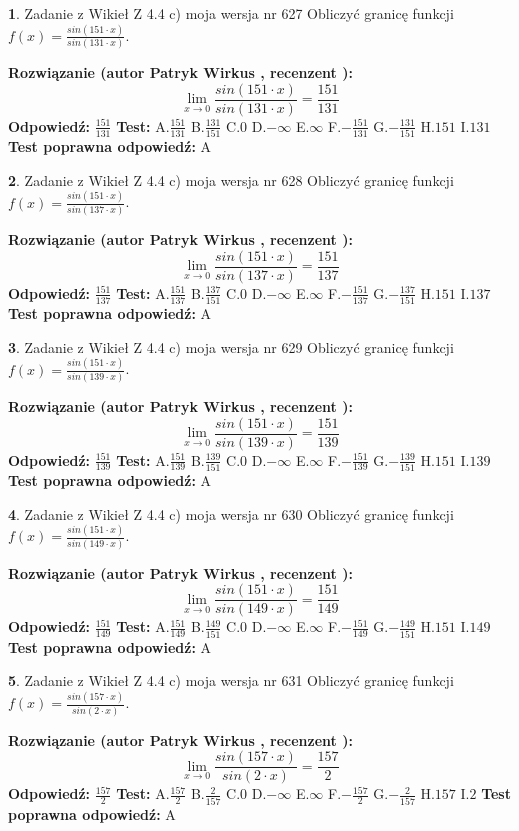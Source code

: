 \documentclass[12pt, a4paper]{article}
\theoremstyle{definition} %
\newtheorem{zad}{}
\newcommand{\zadStart}[1]{\begin{zad}#1\newline}
\newcommand{\zadStop}{\end{zad}}
\newcommand{\rozwStart}[2]{\noindent \textbf{Rozwiązanie (autor #1 , recenzent #2): }\newline}
\newcommand{\rozwStop}{\newline}
\newcommand{\odpStart}{\noindent \textbf{Odpowiedź:}\newline}
\newcommand{\odpStop}{\newline}
\newcommand{\testStart}{\noindent \textbf{Test:}\newline}
\newcommand{\testStop}{\newline}
\newcommand{\kluczStart}{\noindent \textbf{Test poprawna odpowiedź:}\newline}
\newcommand{\kluczStop}{\newline}
\begin{document}
\zadStart{Zadanie z Wikieł Z 4.4 c) moja wersja nr 627}
Obliczyć granicę funkcji $f(x)=\frac{sin(151\cdot x)}{sin(131\cdot x)}$.
\zadStop
\rozwStart{Patryk Wirkus}{}
$$\lim\limits_{x\to 0}\frac{sin(151\cdot x)}{sin(131\cdot x)}=
\frac{151}{131}$$
\rozwStop
\odpStart
$\frac{151}{131}$
\odpStop
\testStart
A.$\frac{151}{131}$
B.$\frac{131}{151}$
C.$0$
D.$-\infty$
E.$\infty$
F.$-\frac{151}{131}$
G.$-\frac{131}{151}$
H.$151$
I.$131$
\testStop
\kluczStart
A
\kluczStop



\zadStart{Zadanie z Wikieł Z 4.4 c) moja wersja nr 628}
Obliczyć granicę funkcji $f(x)=\frac{sin(151\cdot x)}{sin(137\cdot x)}$.
\zadStop
\rozwStart{Patryk Wirkus}{}
$$\lim\limits_{x\to 0}\frac{sin(151\cdot x)}{sin(137\cdot x)}=
\frac{151}{137}$$
\rozwStop
\odpStart
$\frac{151}{137}$
\odpStop
\testStart
A.$\frac{151}{137}$
B.$\frac{137}{151}$
C.$0$
D.$-\infty$
E.$\infty$
F.$-\frac{151}{137}$
G.$-\frac{137}{151}$
H.$151$
I.$137$
\testStop
\kluczStart
A
\kluczStop



\zadStart{Zadanie z Wikieł Z 4.4 c) moja wersja nr 629}
Obliczyć granicę funkcji $f(x)=\frac{sin(151\cdot x)}{sin(139\cdot x)}$.
\zadStop
\rozwStart{Patryk Wirkus}{}
$$\lim\limits_{x\to 0}\frac{sin(151\cdot x)}{sin(139\cdot x)}=
\frac{151}{139}$$
\rozwStop
\odpStart
$\frac{151}{139}$
\odpStop
\testStart
A.$\frac{151}{139}$
B.$\frac{139}{151}$
C.$0$
D.$-\infty$
E.$\infty$
F.$-\frac{151}{139}$
G.$-\frac{139}{151}$
H.$151$
I.$139$
\testStop
\kluczStart
A
\kluczStop



\zadStart{Zadanie z Wikieł Z 4.4 c) moja wersja nr 630}
Obliczyć granicę funkcji $f(x)=\frac{sin(151\cdot x)}{sin(149\cdot x)}$.
\zadStop
\rozwStart{Patryk Wirkus}{}
$$\lim\limits_{x\to 0}\frac{sin(151\cdot x)}{sin(149\cdot x)}=
\frac{151}{149}$$
\rozwStop
\odpStart
$\frac{151}{149}$
\odpStop
\testStart
A.$\frac{151}{149}$
B.$\frac{149}{151}$
C.$0$
D.$-\infty$
E.$\infty$
F.$-\frac{151}{149}$
G.$-\frac{149}{151}$
H.$151$
I.$149$
\testStop
\kluczStart
A
\kluczStop



\zadStart{Zadanie z Wikieł Z 4.4 c) moja wersja nr 631}
Obliczyć granicę funkcji $f(x)=\frac{sin(157\cdot x)}{sin(2\cdot x)}$.
\zadStop
\rozwStart{Patryk Wirkus}{}
$$\lim\limits_{x\to 0}\frac{sin(157\cdot x)}{sin(2\cdot x)}=
\frac{157}{2}$$
\rozwStop
\odpStart
$\frac{157}{2}$
\odpStop
\testStart
A.$\frac{157}{2}$
B.$\frac{2}{157}$
C.$0$
D.$-\infty$
E.$\infty$
F.$-\frac{157}{2}$
G.$-\frac{2}{157}$
H.$157$
I.$2$
\testStop
\kluczStart
A
\kluczStop
\end{document}

